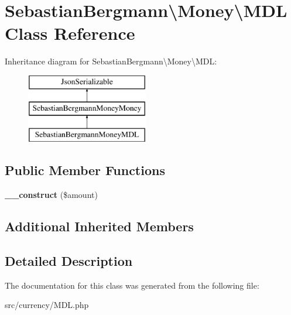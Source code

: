 \hypertarget{classSebastianBergmann_1_1Money_1_1MDL}{}\section{Sebastian\+Bergmann\textbackslash{}Money\textbackslash{}M\+D\+L Class Reference}
\label{classSebastianBergmann_1_1Money_1_1MDL}
Inheritance diagram for Sebastian\+Bergmann\textbackslash{}Money\textbackslash{}M\+D\+L\+:\begin{figure}[H]
\begin{center}
\leavevmode
\includegraphics[height=3.000000cm]{classSebastianBergmann_1_1Money_1_1MDL}
\end{center}
\end{figure}
\subsection*{Public Member Functions}
\begin{DoxyCompactItemize}
\item 
\hypertarget{classSebastianBergmann_1_1Money_1_1MDL_a1bf45f9748ae86a8610efd3fdf52d7da}{}{\bfseries \+\_\+\+\_\+construct} (\$amount)\label{classSebastianBergmann_1_1Money_1_1MDL_a1bf45f9748ae86a8610efd3fdf52d7da}

\end{DoxyCompactItemize}
\subsection*{Additional Inherited Members}


\subsection{Detailed Description}


The documentation for this class was generated from the following file\+:\begin{DoxyCompactItemize}
\item 
src/currency/M\+D\+L.\+php\end{DoxyCompactItemize}
